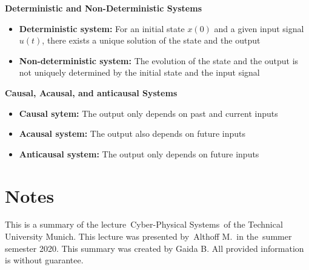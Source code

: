 \documentclass[10pt,a4paper]{article}
\newcommand{\lecture}{Cyber-Physical Systems} %
\newcommand{\lecturer}{Althoff M.} %
\newcommand{\semseter}{summer semester 2020} %
\begin{document}
\textbf{Deterministic and Non-Deterministic Systems}
\begin{itemize}
	\item \textbf{Deterministic system:} For an initial state $x(0)$ and a given input signal $u(t)$, there exists a unique solution of the state and the output
	\item \textbf{Non-deterministic system:} The evolution of the state and the output is not uniquely determined by the initial state and the input signal
\end{itemize}

\textbf{Causal, Acausal, and anticausal Systems}
\begin{itemize}
	\item \textbf{Causal sytem:} The output only depends on past and current inputs
	\item \textbf{Acausal system:} The output also depends on future inputs
	\item \textbf{Anticausal system:} The output only depends on future inputs
\end{itemize}

\pagebreak
\section*{Notes}
This is a summary of the lecture~\lecture~of the Technical University Munich.
This lecture was presented by~\lecturer~in the~\semseter.
This summary was created by Gaida B.
All provided information is without guarantee.


\end{document}
